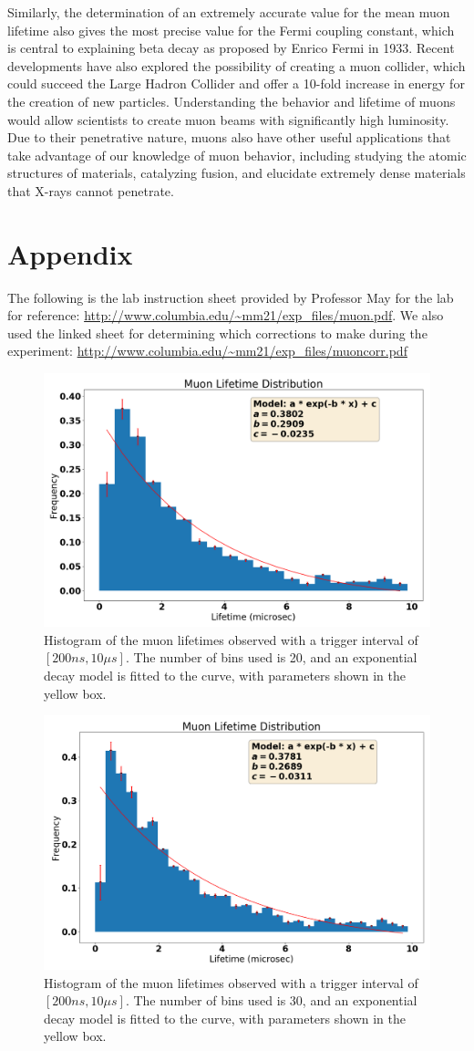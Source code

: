 \documentclass[
 reprint,
 twocolumn,
 amsmath,amssymb,
 aps,
 pra,
 floatfix,
]{revtex4-1}
\begin{document}
Similarly, the determination of an extremely accurate value for the mean muon
lifetime also gives the most precise value for the Fermi coupling constant,
which is central to explaining beta decay as proposed by Enrico Fermi in 1933.
Recent developments have also explored the possibility of creating a muon collider,
which could succeed the Large Hadron Collider and offer a 10-fold increase in
energy for the creation of new particles. Understanding the behavior and lifetime
of muons would allow scientists to create muon beams with significantly high
luminosity. Due to their penetrative nature, muons also have other useful
applications that take advantage of our knowledge of muon behavior, including
studying the atomic structures of materials, catalyzing fusion, and elucidate
extremely dense materials that X-rays cannot penetrate.\cite{bross}

\appendix

\section*{Appendix}

The following is the lab instruction sheet provided by Professor May for the
lab for reference: \url{http://www.columbia.edu/~mm21/exp_files/muon.pdf}.
We also used the linked sheet for determining which corrections to make during
the experiment: \url{http://www.columbia.edu/~mm21/exp_files/muoncorr.pdf}

\onecolumngrid

\begin{figure}
    \includegraphics[width=0.4\columnwidth]{hist20.png}
    \centering
    \caption{Histogram of the muon lifetimes observed with a trigger interval
             of $[200ns,10 \mu s]$. The number of bins used is 20, and an
             exponential decay model is fitted to the curve, with parameters
             shown in the yellow box.}
\end{figure}

\begin{figure}
    \includegraphics[width=0.4\columnwidth]{hist30.png}
    \centering
    \caption{Histogram of the muon lifetimes observed with a trigger interval
             of $[200ns,10 \mu s]$. The number of bins used is 30, and an
             exponential decay model is fitted to the curve, with parameters
             shown in the yellow box.}
\end{figure}


\end{document}
